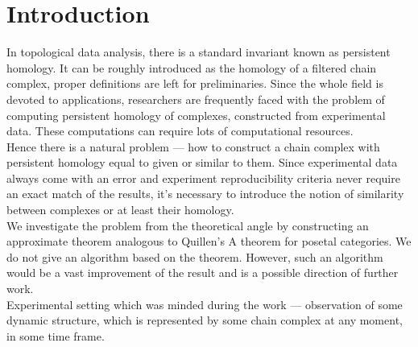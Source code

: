 \documentclass[a4paper, 12pt]{article}
\numberwithin{equation}{section}
\theoremstyle{definition}
\theoremstyle{remark}
\begin{document}
\section{Introduction}

In topological data analysis, there is a standard invariant known as persistent homology. It can be roughly introduced as the homology of a filtered chain complex, proper definitions are left for preliminaries. Since the whole field is devoted to applications, researchers are frequently faced with the problem of computing persistent homology of complexes, constructed from experimental data. These computations can require lots of computational resources.\\

Hence there is a natural problem --- how to construct a chain complex with persistent homology equal to given or similar to them. Since experimental data always come with an error and experiment reproducibility criteria never require an exact match of the results, it's necessary to introduce the notion of similarity between complexes or at least their homology.\\

We investigate the problem from the theoretical angle by constructing an approximate theorem analogous to Quillen's A theorem for posetal categories. We do not give an algorithm based on the theorem. However, such an algorithm would be a vast improvement of the result and is a possible direction of further work.\\

Experimental setting which was minded during the work --- observation of some dynamic structure, which is represented by some chain complex at any moment, in some time frame.\\
\end{document}
